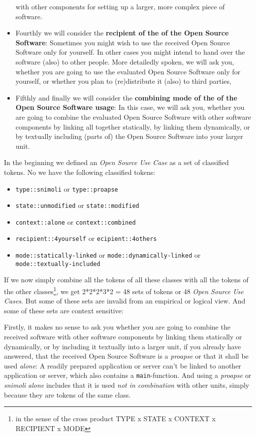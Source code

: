 \begin{itemize}
  with other components for setting up a larger, more complex piece of software.
  \item Fourthly we will consider the \textbf{recipient of the of the Open
  Source Software}: Sometimes you might wish to use the received Open
  Source Software only for yourself. In other cases you might intend to
  hand over the software (also) to other people. More detailedly spoken, we will
  ask you, whether you are going to use the evaluated Open Source Software only
  for yourself, or whether you plan to (re)distribute it (also) to third
  parties,
  \item Fifthly and finally we will consider the \textbf{combining mode of the
  of the Open Source Software usage}: In this case, we will ask you, whether you
  are going to combine the evaluated Open Source Software with other
  software components by linking all together statically, by linking them
  dynamically, or by textually including (parts of) the Open Source Software
  into your larger unit.
\end{itemize}

In the beginning we defined an \emph{Open Source Use Case} as a set of
classified tokens. No we have the following classified tokens:
\begin{itemize}
  \item \texttt{type::snimoli} or \texttt{type::proapse}
  \item \texttt{state::unmodified} or \texttt{state::modified}
  \item \texttt{context::alone} or \texttt{context::combined}
  \item \texttt{recipient::4yourself} or \texttt{ecipient::4others}
  \item \texttt{mode::statically-linked} or \texttt{mode::dynamically-linked} or
  \\ \texttt{mode::textually-included}
\end{itemize}

If we now simply combine all the tokens of all these classes with all the tokens
of the other classes\footnote{in the sense of the cross product
TYPE x STATE x CONTEXT x RECIPIENT x MODE}, we get 2*2*2*3*2 = 48 sets of tokens
or 48 \textit{Open Source Use Cases}. But some of these sets are invalid from
an empirical or logical view. And some of these sets are context sensitive:

Firstly, it makes no sense to ask you whether you are going to combine the
received software with other software components by linking them statically or
dynamically, or by including it textually into a larger unit, if you already
have answered, that the received Open Source Software is a \textit{proapse} or
that it shall be used \textit{alone}: A readily prepared application or server
can't be linked to another application or server, which also contains a
\texttt{main}-function. And using a \textit{proapse} or \textit{snimoli}
\textit{alone} includes that it is used \textit{not in combination} with other
units, simply because they are tokens of the same class.

